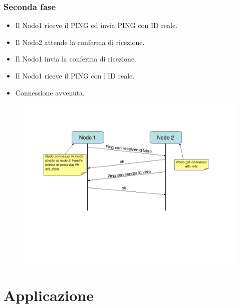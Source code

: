 \documentclass[a4paper,italian,12pt]{beamer}
\begin{document}
			\begin{frame}
				\frametitle{Seconda fase}
				\begin{itemize}
					\item Il Nodo1 riceve il PING ed invia PING con ID reale.
					\item Il Nodo2 attende la conferma di ricezione.
					\item Il Nodo1 invia la conferma di ricezione.
					\item Il Nodo1 riceve il PING con l'ID reale.
					\item Connessione avvenuta.
				\end{itemize}
				\begin{figure}[H]
					\begin{center}
						\includegraphics[scale=0.3]{etc/Bootstrap.png}
					\end{center}
				\end{figure}
			\end{frame}

	\section{Applicazione}
\end{document}
